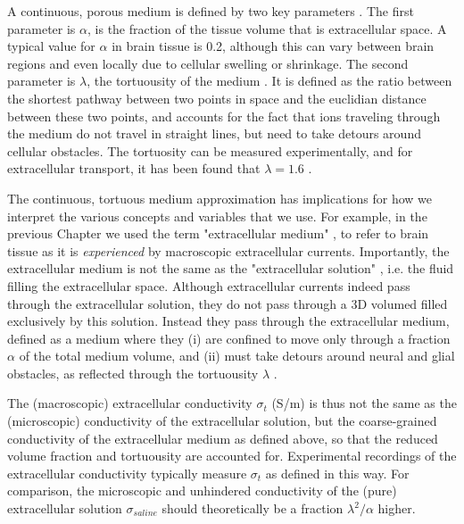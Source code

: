 A continuous, porous medium is defined by two key parameters \citep{Nicholson1981}. The first parameter is $\alpha$, is the fraction of the tissue volume that is extracellular space. A typical value for $\alpha$ in brain tissue is 0.2, although this can vary between brain regions and even locally due to cellular swelling or shrinkage. The second parameter is $\lambda$, the tortuousity of the medium \citep{Nicholson1981}. It is defined as the ratio between the shortest pathway between two points in space and the euclidian distance between these two points, and accounts for the fact that ions traveling through the medium do not travel in straight lines, but need to take detours around cellular obstacles. The tortuosity can be measured experimentally, and for extracellular transport, it has been found that $\lambda = 1.6$ \citep{Nicholson1998}. 

The continuous, tortuous medium approximation has implications for how we interpret the various concepts and variables that we use. For example, in the previous Chapter we used the term "extracellular medium" , to refer to brain tissue as it is \textit{experienced} by macroscopic extracellular currents. Importantly, the extracellular medium is not the same as the "extracellular solution" , i.e. the fluid filling the extracellular space. Although extracellular currents indeed pass through the extracellular solution, they do not pass through a 3D volumed filled exclusively by this solution. Instead they pass through the extracellular medium, defined as a medium where they (i) are confined to move only through a fraction $\alpha$ of the total medium volume, and (ii) must take detours around neural and glial obstacles, as reflected through the tortuousity $\lambda$ \citep{Nicholson1998, Nunez2006}. 

The (macroscopic) extracellular conductivity $\sigma_t$ (S/m)  is thus not the same as the (microscopic) conductivity of the extracellular solution, but the coarse-grained conductivity of the extracellular medium as defined above, so that the reduced volume fraction and tortuousity are accounted for. Experimental recordings of the extracellular conductivity typically measure $\sigma_t$ as defined in this way. For comparison, the microscopic and unhindered conductivity of the (pure) extracellular solution $\sigma_{saline}$ should theoretically be a fraction $\lambda^2/\alpha$ higher. 


\subsection{}
\label{sec:Sigma:Anisotropic}

